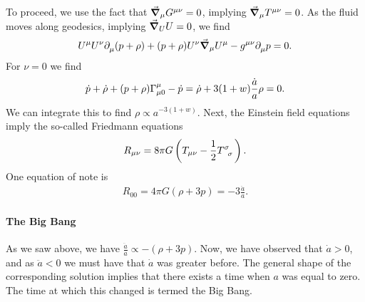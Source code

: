 To proceed, we use the fact that $\grad_{\mu}{G^{\mu\nu}} = 0$, implying $\grad_{\mu}{T^{\mu\nu}} = 0$. As the fluid moves along geodesics, implying $\grad_{U}{U} = 0$, we find
\begin{align*}
	U^{\mu}U^{\nu}\partial^{}_{\mu}(p + \rho) + (p + \rho)U^{\nu}\grad_{\mu}{U^{\mu}} - g^{\mu\nu}\partial^{}_{\mu}p = 0.
\end{align*}
For $\nu = 0$ we find
\begin{align*}
	\dot{p} + \dot{\rho} + (p + \rho)\chris{\mu}{\mu}{0} - \dot{p} = \dot{\rho} + 3(1 + w)\frac{\dot{a}}{a}\rho = 0.
\end{align*}
We can integrate this to find $\rho\propto a^{-3(1 + w)}$. Next, the Einstein field equations imply the so-called Friedmann equations
\begin{align*}
	R_{\mu\nu} = 8\pi G\left(T_{\mu\nu} - \frac{1}{2}\tensor{T}{^{\sigma}_{\sigma}}\right).
\end{align*}
One equation of note is
\begin{align*}
	R_{00} = 4\pi G(\rho + 3p) = -3\frac{\ddot{a}}{a}.
\end{align*}

\paragraph{The Big Bang}
As we saw above, we have $\frac{\ddot{a}}{a} \propto -(\rho + 3p)$. Now, we have observed that $\dot{a} > 0$, and as $\ddot{a} < 0$ we must have that $\dot{a}$ was greater before. The general shape of the corresponding solution implies that there exists a time when $a$ was equal to zero. The time at which this changed is termed the Big Bang.